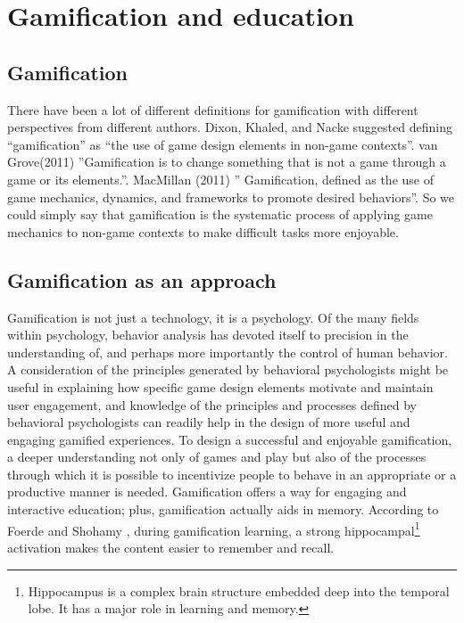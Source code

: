 \documentclass[../main.tex]{subfiles}
\begin{document}
\section{Gamification and education}
\subsection{Gamification}
There have been a lot of different definitions for gamification with different perspectives from different authors. Dixon, Khaled, and Nacke suggested defining “gamification” as “the use of game design elements in non-game contexts”. van Grove(2011) \cite{2} ”Gamification is to change something that is not a game through a game or its elements.”. MacMillan (2011) \cite{3} ” Gamification, defined as the use of game mechanics, dynamics, and frameworks to promote desired behaviors”. So we could simply say that gamification is the systematic process of applying game mechanics to non-game contexts to make difficult tasks more enjoyable. 
\subsection{Gamification as an approach}
Gamification is not just a technology, it is a psychology. Of the many fields within psychology, behavior analysis has devoted itself to precision in the understanding of, and perhaps more importantly the control of human behavior. A consideration of the principles generated by behavioral psychologists might be useful in explaining how specific game design elements motivate and maintain user engagement, and knowledge of the principles and processes defined by behavioral psychologists can readily help in the design of more useful and engaging gamified experiences. 
To design a successful and enjoyable gamification, a deeper understanding not only of games and play but also of the processes through which it is possible to incentivize people to behave in an appropriate or a productive manner is needed. Gamification offers a way for engaging and interactive education; plus, gamification actually aids in memory. According to Foerde and Shohamy \cite{4}, during gamification learning, a strong hippocampal\footnote{Hippocampus is a complex brain structure embedded deep into the temporal lobe. It has a major role in learning and memory.} activation makes the content easier to remember and recall.
\end{document}
